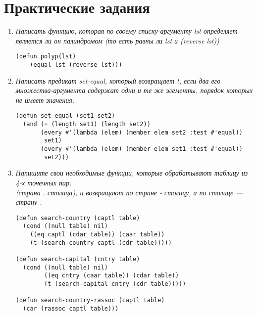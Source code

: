 \chapter{Практические задания}
\begin{enumerate}[wide=0pt]
\item \textit{Написать функцию, которая по своему списку-аргументу lst определяет является ли он палиндромом (то есть равны ли lst и (reverse lst))}
\begin{lstlisting}
(defun polyp(lst) 
	(equal lst (reverse lst)))
\end{lstlisting}
\item \textit{Написать предикат set-equal, который возвращает t, если два его \\ множества-аргумента содержат одни и те же элементы, порядок которых не имеет значения.}
\begin{lstlisting}
(defun set-equal (set1 set2)
  (and (= (length set1) (length set2))
       (every #'(lambda (elem) (member elem set2 :test #'equal)) 
        set1)
       (every #'(lambda (elem) (member elem set1 :test #'equal)) 
        set2)))
\end{lstlisting}
\item \textit{Напишите свои необходимые функции, которые обрабатывают таблицу из 4-х точечных пар:\\(страна . столица), и возвращают по стране - столицу, а по столице --- страну .}
\begin{lstlisting}	
(defun search-country (captl table)
  (cond ((null table) nil)
    ((eq captl (cdar table)) (caar table))
    (t (search-country captl (cdr table)))))

(defun search-capital (cntry table)
  (cond ((null table) nil)
        ((eq cntry (caar table)) (cdar table))
        (t (search-capital cntry (cdr table)))))
        
(defun search-country-rassoc (captl table)
  (car (rassoc captl table)))


\end{lstlisting}
\end{enumerate}
